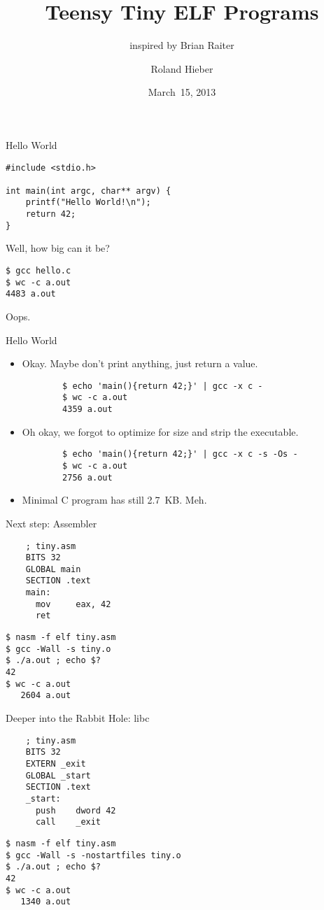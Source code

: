 \documentclass{beamer}
\author{Roland Hieber}
\title{Teensy Tiny ELF Programs}
\subtitle{inspired by Brian Raiter}
\institute{Stratum~0~e.\,V.}
\date{March~15, 2013}
\begin{document}
\begin{frame}
	\maketitle
\end{frame}


\begin{frame}[fragile]{Hello World}
\begin{lstlisting}
#include <stdio.h>

int main(int argc, char** argv) {
	printf("Hello World!\n");
	return 42;
}
\end{lstlisting}
Well, how big can it be?
\pause

\begin{lstlisting}
$ gcc hello.c
$ wc -c a.out
4483 a.out
\end{lstlisting}

Oops.
\end{frame}

\begin{frame}[fragile]{Hello World}
\begin{itemize}
	\item Okay. Maybe don't print anything, just return a value.
	\begin{lstlisting}
		$ echo 'main(){return 42;}' | gcc -x c -
		$ wc -c a.out
		4359 a.out
	\end{lstlisting}
	\pause
	\item Oh okay, we forgot to optimize for size and strip the executable.
	\begin{lstlisting}
		$ echo 'main(){return 42;}' | gcc -x c -s -Os -
		$ wc -c a.out
		2756 a.out
	\end{lstlisting}
	\pause
	\item Minimal C program has still 2{.}7~KB. Meh.
\end{itemize}
\end{frame}

\begin{frame}[fragile]{Next step: Assembler}
\begin{lstlisting}
	; tiny.asm
	BITS 32
	GLOBAL main
	SECTION .text
	main:
	  mov     eax, 42
	  ret
\end{lstlisting}
\pause
\begin{lstlisting}
$ nasm -f elf tiny.asm
$ gcc -Wall -s tiny.o
$ ./a.out ; echo $?
42
$ wc -c a.out
   2604 a.out
\end{lstlisting}
\end{frame}

\begin{frame}[fragile]{Deeper into the Rabbit Hole: libc}
\begin{lstlisting}
	; tiny.asm
	BITS 32
	EXTERN _exit
	GLOBAL _start
	SECTION .text
	_start:
	  push    dword 42
	  call    _exit
\end{lstlisting}
\pause
\begin{lstlisting}
$ nasm -f elf tiny.asm
$ gcc -Wall -s -nostartfiles tiny.o
$ ./a.out ; echo $?
42
$ wc -c a.out
   1340 a.out
\end{lstlisting}
\end{frame}
\end{document}
